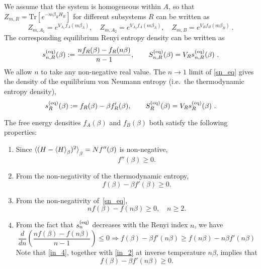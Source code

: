 \documentclass[a4paper,11pt]{article}
\newcommand{\be}{\begin{equation}}
\newcommand{\ee}{\end{equation}}
\begin{document}
We assume that the system is homogeneous within $A$, so that $Z_{m,R}= \text{Tr}[e^{-m\beta_R H_R}]$ for different subsystems $R$ can be written as 
\be 
Z_{m,A_1} = e^{V_{A_1} f_A(m\beta_A)}, \quad Z_{m,A_2} = e^{V_{A_2} f_A(m\beta_A)}, \quad Z_{m,B} = e^{V_{B} f_B (m\beta_B)} \ .
\ee
The corresponding equilibrium Renyi entropy density can be written as 
\be \label{sn_eq}
s^{\rm (eq)}_{n, R}(\beta) := \frac{n f_R (\beta) - f_R (n\beta)}{n-1} , \qquad S^{\rm (eq)}_{n,R}(\beta) = V_R s^{\rm (eq)}_{n,R}(\beta) \ .
\ee
We allow $n$ to take any non-negative real value. The $n\rightarrow 1$ limit of \eqref{sn_eq} gives the density of the equilibrium von Neumann entropy (i.e.~the thermodynamic entropy density), 
\be \label{s1_eq}
s^{\rm (eq)}_R (\beta) := f_R (\beta) - \beta f_R '(\beta) , \qquad S^{\rm (eq)}_{R}(\beta) = V_R s^{\rm (eq)}_R (\beta) 
 \ .
\ee

The free energy densities $f_A(\beta)$ and $f_B(\beta)$ both satisfy the following properties: 
\begin{enumerate} 
\item Since $\braket{(H-\braket{H}_{\beta})^2}_{\beta} = N f''(\beta)$ is non-negative, 
\be 
f''(\beta)\geq 0. \label{in_1}
\ee
\item From the non-negativity of the thermodynamic entropy, 
\be 
f(\beta) - \beta f'(\beta) \geq 0. \label{in_2}
\ee
\item From the non-negativity of~\eqref{sn_eq},
\be 
nf(\beta)-f(n\beta) \geq 0, \quad n\geq 2. \label{in_3}
\ee
\item From the fact that $s_{n}^{\rm (eq)}$ decreases with the Renyi index $n$, we have 
\be 
\frac{d}{dn}\left(\frac{n f(\beta)- f(n\beta)}{n-1}\right) \leq 0 \Rightarrow f(\beta) - \beta f'(n\beta) \geq f(n\beta) - n \beta f'(n\beta) \label{in_4}
\ee
Note that \eqref{in_4}, together with \eqref{in_2} at inverse temperature $n\beta$, implies that 
\be 
f(\beta) - \beta f'(n\beta) \geq 0. \label{in_5}
\ee
\end{enumerate} 
\end{document}
